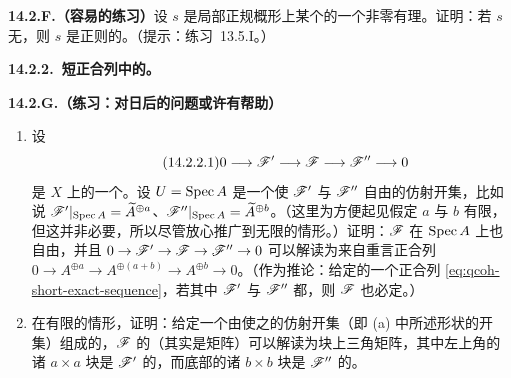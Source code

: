 \textbf{14.2.F.（容易的练习）}\quad 设 $s$ 是局部\trNoetherian{}正规概形上某个\trInvertibleSheaf{}的一个非零有理\trSection。证明：若 $s$ 无\trPole，则 $s$ 是正则的。（提示：\mbox{练习~13.5.I}。）

\textbf{14.2.2.\ 短正合列中的\trLocallyFreeSheaf。}

\textbf{14.2.G.（练习：对日后的问题或许有帮助）}\quad
\begin{enumerate}[label=(\alph*)]
\item 设
\begin{equation*}\tag{14.2.2.1}\label{eq:qcoh-short-exact-sequence}
0\longrightarrow\mathscr{F}'\longrightarrow\mathscr{F}\longrightarrow\mathscr{F}''\longrightarrow 0
\end{equation*}
是 $X$ 上\trQCSheaf{}的一个\trShortExactSequence。设 $U=\operatorname{Spec} A$ 是一个使 $\mathscr{F}'$ 与 $\mathscr{F}''$ 自由的仿射开集，比如说 $\mathscr{F}'|_{\operatorname{Spec} A}=\widetilde{A}^{\oplus a}$、$\mathscr{F}''|_{\operatorname{Spec} A}=\widetilde{A}^{\oplus b}$。（这里为方便起见假定 $a$ 与 $b$ 有限，但这并非必要，所以尽管放心推广到无限\trRank{}的情形。）证明：$\mathscr{F}$ 在 $\operatorname{Spec} A$ 上也自由，并且 $0\to\mathscr{F}'\to\mathscr{F}\to\mathscr{F}''\to 0$ 可以解读为来自重言正合列 $0\to A^{\oplus a}\to A^{\oplus(a+b)}\to A^{\oplus b}\to 0$。（作为推论：给定\trQCSheaf{}的一个正合列 \eqref{eq:qcoh-short-exact-sequence}，若其中 $\mathscr{F}'$ 与 $\mathscr{F}''$ 都\trLocallyFree，则 $\mathscr{F}$ 也必定\trLocallyFree。）
\item 在有限\trRank{}的情形，证明：给定一个由使之\trTrivialization{}的仿射开集（即 (a) 中所述形状的开集）组成的\trOpenCover，$\mathscr{F}$ 的\trTransitionFunction（其实是矩阵）可以解读为块上三角矩阵，其中左上角的诸 $a\times a$ 块是 $\mathscr{F}'$ 的\trTransitionFunction，而底部的诸 $b\times b$ 块是 $\mathscr{F}''$ 的\trTransitionFunction。
\end{enumerate}

